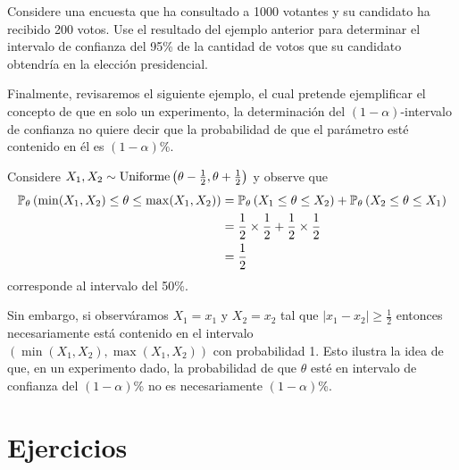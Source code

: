 \begin{exercise} Considere una encuesta que ha consultado a 1000 votantes y su candidato ha recibido 200 votos. Use el resultado del ejemplo anterior para determinar el intervalo de confianza del 95\% de la cantidad de votos que su candidato obtendría en la elección presidencial. 
\end{exercise}

Finalmente, revisaremos el siguiente ejemplo, el cual pretende ejemplificar el concepto de que en solo un experimento, la determinación del $(1-\alpha)$-intervalo de confianza no quiere decir que la probabilidad de que el parámetro esté contenido en él es $(1-\alpha)$\%. 

\begin{example}
\label{eq:unif_int_conf}Considere $X_1,X_2\sim\text{Uniforme}\left(\theta-\tfrac{1}{2},\theta+\tfrac{1}{2}\right)$ y observe que 
\begin{align*}
	\mathbb{P}_\theta \left(\min(X_1,X_2) \leq \theta \leq \max(X_1,X_2)\right) 
		&= \mathbb{P}_\theta \left( X_1 \leq \theta \leq X_2\right)  + \mathbb{P}_\theta \left( X_2 \leq \theta \leq X_1\right) \\
		&= \frac{1}{2}\times \frac{1}{2} + \frac{1}{2}\times\frac{1}{2}\\
		&= \frac{1}{2}
\end{align*}
corresponde al intervalo del 50\%. 

Sin embargo, si observáramos $X_1 = x_1$ y $X_2 = x_2$ tal que $|x_1-x_2|\geq\tfrac{1}{2}$ entonces necesariamente está contenido en el intervalo $(\min(X_1,X_2) , \max(X_1,X_2))$ con probabilidad 1. Esto ilustra la idea de que, en un experimento dado, la probabilidad de que $\theta$ esté en intervalo de confianza del $(1-\alpha)$\% no es necesariamente $(1-\alpha)$\%.
\end{example}


\section{Ejercicios}

